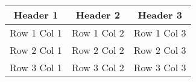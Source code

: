 \documentclass{article}
\begin{document}
\begin{table}[h]
    \centering
    \begin{tabular}{|c|c|c|}
        \hline
        \rowcolor[gray]{0.9} Header 1 & Header 2 & Header 3 \\
        \hline
        Row 1 Col 1 & Row 1 Col 2 & Row 1 Col 3 \\
        \hline
        Row 2 Col 1 & Row 2 Col 2 & Row 2 Col 3 \\
        \hline
        Row 3 Col 1 & Row 3 Col 2 & Row 3 Col 3 \\
        \hline
    \end{tabular}
\end{table}
\end{document}
